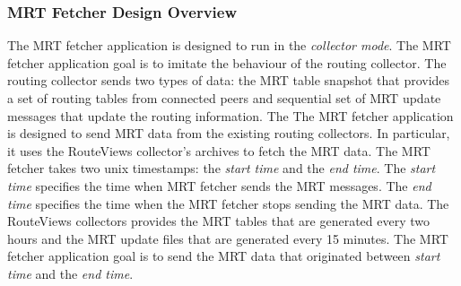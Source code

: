   
  
 



\subsubsection{MRT Fetcher Design Overview}
\label{sec:mrtfetcherdesign}


The MRT fetcher application is designed to run in the \emph{collector mode}. The MRT fetcher application goal is to imitate the behaviour of the routing collector. The routing collector sends two types of data: the MRT table snapshot that provides a set of  routing tables from connected peers and sequential set of MRT update messages that update the routing information.  The  The MRT fetcher application is designed to send MRT data from the existing routing collectors.  In particular, it uses the RouteViews collector's archives to fetch the MRT data. The MRT fetcher takes two unix timestamps: the \emph{start time} and the \emph{end time}. The \emph{start time} specifies the time when MRT fetcher sends the MRT messages. The  \emph{end time} specifies the time when the MRT fetcher stops sending the MRT data.   The RouteViews collectors provides the MRT tables that are generated every two hours and the MRT update files that are generated every 15 minutes. The MRT fetcher application goal is to send the MRT data that originated between \emph{start time} and the \emph{end time}.  


